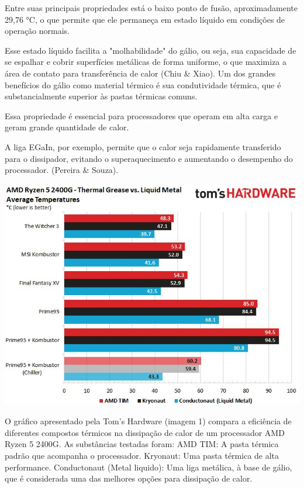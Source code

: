 \documentclass[12pt]{article}
\begin{document}
Entre suas principais propriedades está o baixo ponto de fusão, aproximadamente 29,76 °C, o que permite que ele permaneça em estado líquido em condições de operação normais. 

Esse estado líquido facilita a "molhabilidade" do gálio, ou seja, sua capacidade de se espalhar e cobrir superfícies metálicas de forma uniforme, o que maximiza a área de contato para transferência de calor (Chiu \& Xiao).
Um dos grandes benefícios do gálio como material térmico é sua condutividade térmica, que é substancialmente superior às pastas térmicas comuns. 

Essa propriedade é essencial para processadores que operam em alta carga e geram grande quantidade de calor. 

A liga EGaIn, por exemplo, permite que o calor seja rapidamente transferido para o dissipador, evitando o superaquecimento e aumentando o desempenho do processador. (Pereira \& Souza).
\begin{adjustbox}{center,caption={Grafico Comparativo entre Pasta térmica e Metal liquido (Imagem: Tom's Hardware)},nofloat=figure,vspace=\bigskipamount}
    \includegraphics[width=15cm]{tio_hardware.jpg}
\end{adjustbox}
O gráfico apresentado pela Tom's Hardware (imagem 1) compara a eficiência de diferentes compostos térmicos na dissipação de calor de um processador AMD Ryzen 5 2400G. 
As substâncias testadas foram:
AMD TIM: A pasta térmica padrão que acompanha o processador.
Kryonaut: Uma pasta térmica de alta performance.
Conductonaut (Metal liquido): Uma liga metálica, à base de gálio, que é considerada uma das melhores opções para dissipação de calor.
\end{document}
